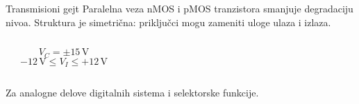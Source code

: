 \begin{frame}[label=09_3-s060]{Transmisioni gejt}
Paralelna veza nMOS i pMOS tranzistora smanjuje degradaciju nivoa. Struktura je simetrična: priključci mogu zameniti uloge ulaza i izlaza.
\begin{columns}[c,onlytextwidth]
\begin{center}
\quad 
\end{center}
\[V_C=\pm15\,\mathrm V\]
\[-12\,\mathrm V\le V_I\le+12\,\mathrm V\]
\begin{center}

\end{center}
\end{columns}
\medskip Za analogne delove digitalnih sistema i selektorske funkcije.
\end{frame}
